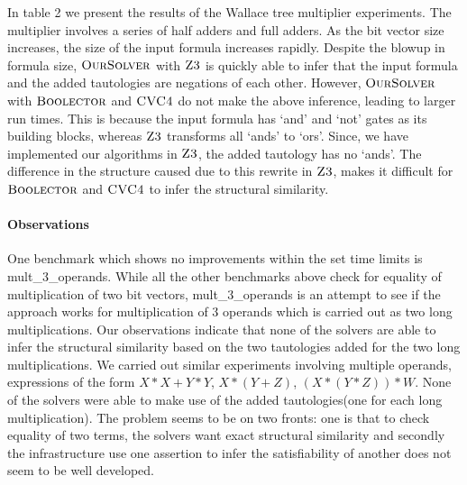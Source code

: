 

In table 2 we present the results of the Wallace tree multiplier experiments. The multiplier involves a series of half adders and full adders. As the bit vector size increases, the size of the input formula increases rapidly. Despite the blowup in formula size, $\textsc{OurSolver}$ with $\textsc{Z3}$ is quickly able to infer that the input formula and the added tautologies are negations of each other. However, $\textsc{OurSolver}$ with $\textsc{Boolector}$ and $\textsc{CVC4}$ do not make the above inference, leading to larger run times. This is because the input formula has `and' and `not' gates as its building blocks, whereas $\textsc{Z3}$ transforms all `ands' to `ors'. Since, we have implemented our algorithms in $\textsc{Z3}$, the added tautology has no `ands'. The difference in the structure caused due to this rewrite in $\textsc{Z3}$, makes it difficult for $\textsc{Boolector}$ and $\textsc{CVC4}$ to infer the structural similarity. 

\paragraph{\bf Observations}
%
One benchmark which shows no improvements within the set time limits is mult\_3\_operands. While all the other benchmarks above check for equality of multiplication of two bit vectors, mult\_3\_operands is an attempt to see if the approach works for multiplication of 3 operands which is carried out as two long multiplications. Our observations indicate that none of the solvers are able to infer the structural similarity based on the two tautologies added for the two long multiplications. We carried out similar experiments involving multiple operands, expressions of the form $X*X + Y*Y$, $X*(Y+Z)$, $(X*(Y*Z))*W$. None of the solvers were able to make use of the added tautologies(one for each long multiplication). The problem seems to be on two fronts: one is that to check equality of two terms, the solvers want exact structural similarity and secondly the infrastructure use one assertion to infer the satisfiability of another does not seem to be well developed. 







